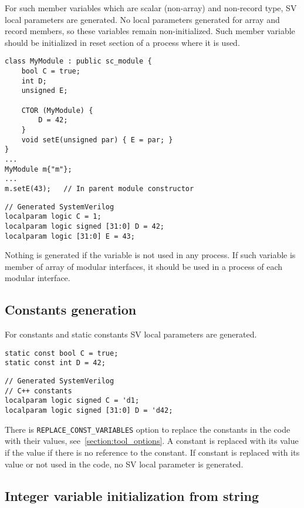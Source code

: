 For such member variables which are scalar (non-array) and non-record type, SV local parameters are generated. 
No local parameters generated for array and record members, so these variables remain non-initialized. Such member variable should be initialized in reset section of a process where it is used.

\begin{lstlisting}[style=mycpp]
class MyModule : public sc_module {
  	bool C = true;
	int D;
   	unsigned E;

	CTOR (MyModule) {
   		D = 42;
	}
	void setE(unsigned par) { E = par; }
}
...
MyModule m{"m"};
...
m.setE(43);   // In parent module constructor
\end{lstlisting}
%
\begin{lstlisting}[style=myverilog]
// Generated SystemVerilog
localparam logic C = 1;
localparam logic signed [31:0] D = 42;
localparam logic [31:0] E = 43;
\end{lstlisting}

Nothing is generated if the variable is not used in any process. If such variable is member of array of modular interfaces, it should be used in a process of each modular interface.

\subsection{Constants generation}\label{section:const_gen}

For constants and static constants SV local parameters are generated.

\begin{lstlisting}[style=mycpp]
static const bool C = true;
static const int D = 42;
\end{lstlisting}
%
\begin{lstlisting}[style=myverilog]
// Generated SystemVerilog
// C++ constants
localparam logic signed C = 'd1;
localparam logic signed [31:0] D = 'd42;
\end{lstlisting}

There is {\tt REPLACE\_CONST\_VARIABLES} option to replace the constants in the code with their values, see~\ref{section:tool_options}. A constant is replaced with its value if the value if there is no reference to the constant. If constant is replaced with its value or not used in the code, no SV local parameter is generated.

\subsection{Integer variable initialization from string}\label{section:string_to_int}


